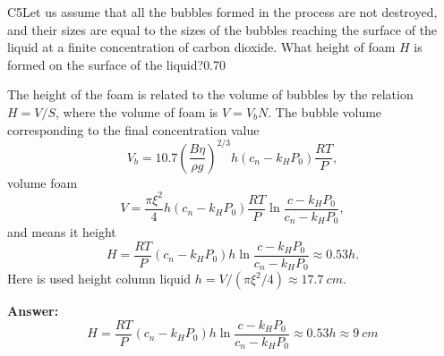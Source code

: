 \documentclass[11pt,a4paper]{article}
\begin{document}
\begin{solcard}{C5}{Let us assume that all the bubbles formed in the process are not destroyed, and their sizes are equal to the sizes of the bubbles reaching the surface of the liquid at a finite concentration of carbon dioxide. What height of foam $H$ is formed on the surface of the liquid?}{0.70}

The height of the foam is related to the volume of bubbles by the relation $H = V/S$, where the volume of foam is $V=V_b N$. The bubble volume corresponding to the final concentration value $$ V_b = 10.7 \left( \frac{B \eta}{\rho g}\right)^{2/3} h (c_n - k_H P_0) \frac{RT}{P}, $$ volume foam $$ V = \frac{\pi \xi^2}{4} h(c_n - k_H P_0) \frac{RT}{P} \ln \frac{c - k_H P_0}{c_n - k_H P_0} , $$ and means it height $$ H = \frac{RT}{P} (c_n - k_H P_0) h \ln \frac{c - k_H P_0}{c_n - k_H P_0} \approx 0.53 h. $$ Here is used height column liquid $h = V/(\pi \xi^2/4) \approx 17.7 ~cm $.

\par\smallskip\noindent\textbf{Answer:} $$ H = \frac{RT}{P} (c_n - k_H P_0) h \ln \frac{c - k_H P_0}{c_n - k_H P_0} \approx 0.53 h \approx 9 ~cm $$
\end{solcard}
\end{document}

